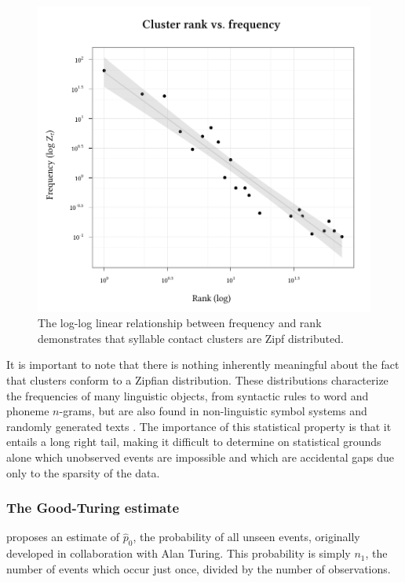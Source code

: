 \begin{figure}
\centering
\includegraphics{cluster.pdf}
\caption{The log-log linear relationship between frequency and rank demonstrates that syllable contact clusters are Zipf distributed.}
\label{clus}
\end{figure}

It is important to note that there is nothing inherently meaningful about the fact that clusters conform to a Zipfian distribution. These distributions characterize the frequencies of many linguistic objects, from syntactic rules \citep{Yang2009} to word \citep{Teahan1998,Ha2002,Baroni2009} and phoneme \citep{Daland2011a} $n$-grams, but are also found in non-linguistic symbol systems \citep{Chomsky1958,Sproat2010} and randomly generated texts \citep{Miller1957,Li1992}. The importance of this statistical property is that it entails a long right tail, making it difficult to determine on statistical grounds alone which unobserved events are impossible and which are accidental gaps due only to the sparsity of the data. 

\subsubsection{The Good-Turing estimate}

\citet{Good1953} proposes an estimate of $\hat{p}_0$, the probability of all unseen events, originally developed in collaboration with Alan Turing. This probability is simply $n_1$, the number of events which occur just once, divided by the number of observations.

